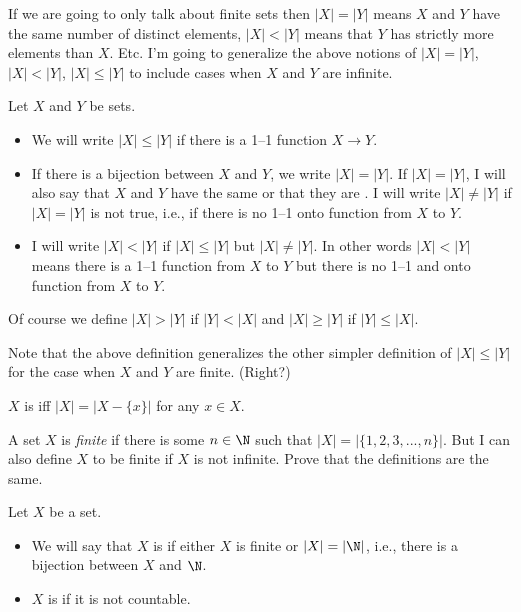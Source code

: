 If we are going to only talk about finite sets
then $|X| = |Y|$ means $X$ and $Y$ have the same number of
distinct elements,
$|X| < |Y|$ means that $Y$ has strictly more elements than
$X$.
Etc.
I'm going to generalize the above notions of
$|X| = |Y|$, $|X| < |Y|$, $|X| \leq |Y|$ to include cases when
$X$ and $Y$ are infinite.

\begin{defn}
  Let $X$ and $Y$ be sets.
  \begin{itemize}
  \item
    We will write $|X| \leq |Y|$ if there is a
    1--1 function $X \rightarrow Y$.
  \item
    If there is a bijection between
    $X$ and $Y$, we write $|X| = |Y|$.
    If $|X| = |Y|$, I will also say that $X$ and $Y$
    have the same
    or that they are
    \sidebarskip{12pt}.
    I will write $|X| \neq |Y|$
    if $|X| = |Y|$ is not true, i.e., if there is no 1--1 onto function
    from $X$ to $Y$.
  \item
    I will write $|X| < |Y|$ if
    $|X| \leq |Y|$ but $|X| \neq |Y|$.
    In other words $|X| < |Y|$ means there is a 1--1 function
    from $X$ to $Y$ but there is no 1--1 and onto function
    from $X$ to $Y$.
  \end{itemize}
  Of course we define $|X| > |Y|$ if $|Y| < |X|$ and
  $|X| \geq |Y|$ if $|Y| \leq |X|$.
\end{defn}

Note that the above definition generalizes
the other simpler definition of $|X| \leq |Y|$ for the case
when $X$ and $Y$ are finite.
(Right?)

\begin{defn}
  $X$ is  iff $|X| = |X - \{x\}|$ for any $x \in X$.
\end{defn}

\begin{ex}
  A set $X$ is \textit{finite} if there is some $n \in \N$ such that
  $|X| = |\{1, 2, 3, ..., n\}|$.
  But I can also define $X$ to be finite if $X$ is not
  infinite.
  Prove that the definitions are the same.
\end{ex}

\begin{defn}
  Let $X$ be a set.
  \begin{itemize}
  \item
    We will say that $X$ is  if
    either $X$ is finite or $|X| = |\N|$, i.e.,
    there is a bijection between $X$ and
    $\N$.
  \item
    $X$ is  if it is not countable.
  \end{itemize}
\end{defn}

